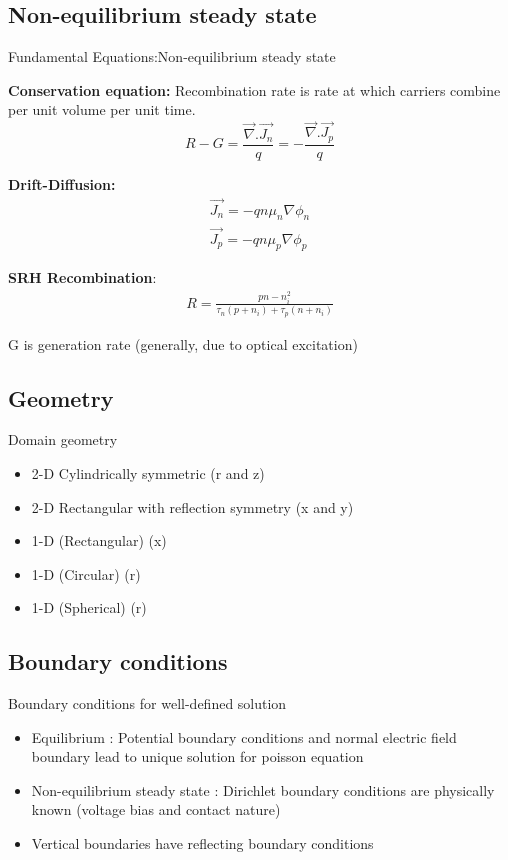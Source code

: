 \documentclass{beamer}
\begin{document}
\subsection{Non-equilibrium steady state}

\begin{frame}{Fundamental Equations:Non-equilibrium steady state}

\textbf{Conservation equation:}
Recombination rate is rate at which carriers combine per unit volume per unit time.
\begin{equation}
R - G =  \frac{\vec{\nabla}.\vec{J_n}}{q} =-\frac{\vec{\nabla}.\vec{J_p}}{q}   \tag{3} \label{eq:3}
\end{equation}

\textbf{Drift-Diffusion:}
\begin{align*}
\vec{J_n} = -qn\mu_n\nabla\phi_n \\ 
\vec{J_p} = -qn\mu_p\nabla\phi_p  \tag{4} \label{eq:4}
\end{align*}

\textbf{SRH Recombination}:
\begin{align*}
R = \frac{pn - n_i^2}{\tau_n(p + n_i) + \tau_p(n + n_i)} \tag{5}\label{eq:5}
\end{align*}

G is generation rate (generally, due to optical excitation)

\end{frame}

\subsection{Geometry}
\begin{frame}{Domain geometry}
\begin{itemize}
	\item 2-D Cylindrically symmetric (r and z)
	\item 2-D Rectangular with reflection symmetry (x and y)
	\item 1-D (Rectangular) (x)
	\item 1-D (Circular) (r)
	\item 1-D (Spherical) (r)
\end{itemize}
\end{frame}	

\subsection{Boundary conditions}

\begin{frame}{Boundary conditions for well-defined solution}
\begin{itemize}
  \item Equilibrium : Potential boundary conditions and normal electric field boundary lead to unique solution for poisson equation	  
  \item Non-equilibrium steady state : Dirichlet boundary conditions are physically known (voltage bias and contact nature)
  \item Vertical boundaries have reflecting boundary conditions
\end{itemize}
\end{frame}
\end{document}
